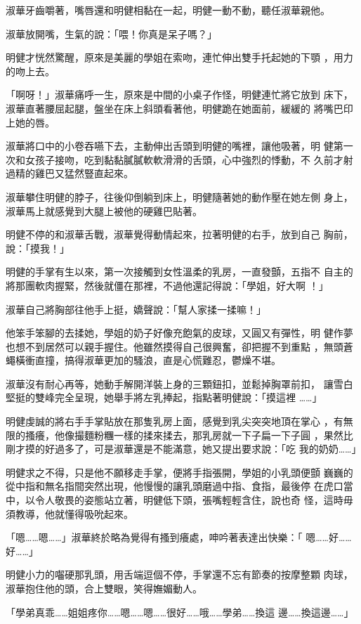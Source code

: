 淑華牙齒嚼著，嘴唇還和明健相黏在一起，明健一動不動，聽任淑華親他。

淑華放開嘴，生氣的說：「喂！你真是呆子嗎？」

明健才恍然驚醒，原來是美麗的學姐在索吻，連忙伸出雙手托起她的下顎
，用力的吻上去。

「啊呀！」淑華痛呼一生，原來是中間的小桌子作怪，明健連忙將它放到
床下，淑華直著腰屈起腿，盤坐在床上斜頭看著他，明健跪在她面前，緩緩的
將嘴巴印上她的唇。

淑華將口中的小卷吞嚥下去，主動伸出舌頭到明健的嘴裡，讓他吸著，明
健第一次和女孩子接吻，吃到黏黏膩膩軟軟滑滑的舌頭，心中強烈的悸動，不
久前才射過精的雞巴又猛然豎直起來。

淑華攀住明健的脖子，往後仰倒躺到床上，明健隨著她的動作壓在她左側
身上，淑華馬上就感覺到大腿上被他的硬雞巴貼著。

明健不停的和淑華舌戰，淑華覺得動情起來，拉著明健的右手，放到自己
胸前，說：「摸我！」

明健的手掌有生以來，第一次接觸到女性溫柔的乳房，一直發顫，五指不
自主的將那團軟肉握緊，然後就僵在那裡，不過他還記得說：「學姐，好大啊
！」

淑華自己將胸部往他手上挺，嬌聲說：「幫人家揉一揉嘛！」

他笨手笨腳的去揉她，學姐的奶子好像充飽氣的皮球，又圓又有彈性，明
健作夢也想不到居然可以親手握住。他雖然摸得自己很興奮，卻把握不到重點
，無頭蒼蠅橫衝直撞，搞得淑華更加的騷浪，直是心慌難忍，鬱燥不堪。

淑華沒有耐心再等，她動手解開洋裝上身的三顆鈕扣，並鬆掉胸罩前扣，
讓雪白堅挺的雙峰完全呈現，她舉手將左乳捧起，指點著明健說：「摸這裡
……」

明健虔誠的將右手手掌貼放在那隻乳房上面，感覺到乳尖突突地頂在掌心
，有無限的搔癢，他像撮麵粉糰一樣的揉來揉去，那乳房就一下子扁一下子圓
，果然比剛才摸的好過多了，可是淑華還是不能滿意，她又提出要求說：「吃
我的奶奶……」

明健求之不得，只是他不願移走手掌，便將手指張開，學姐的小乳頭便顫
巍巍的從中指和無名指間突然出現，他慢慢的讓乳頭磨過中指、食指，最後停
在虎口當中，以令人敬畏的姿態站立著，明健低下頭，張嘴輕輕含住，說也奇
怪，這時毋須教導，他就懂得吸吮起來。

「嗯……嗯……」淑華終於略為覺得有搔到癢處，呻吟著表達出快樂：「
嗯……好……好……」

明健小力的囓硬那乳頭，用舌端逗個不停，手掌還不忘有節奏的按摩整顆
肉球，淑華抱住他的頭，合上雙眼，笑得嫵媚動人。

「學弟真乖……姐姐疼你……嗯……嗯……很好……哦……學弟……換這
邊……換這邊……」

